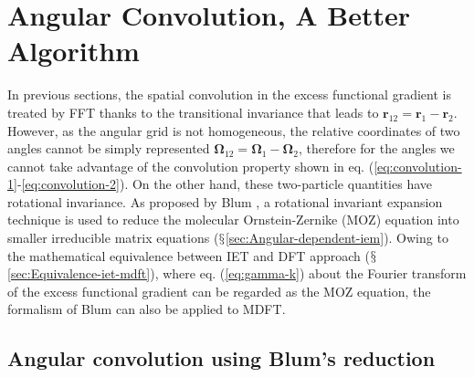 
\chapter{Angular Convolution, A Better Algorithm\label{chpt:angular-convolution}}

In previous sections, the spatial convolution in the excess functional
gradient is treated by \acs{FFT} thanks to the transitional invariance
that leads to $\mathbf{r}_{12}=\mathbf{r}_{1}-\mathbf{r}_{2}$. However,
as the angular grid is not homogeneous, the relative coordinates of
two angles cannot be simply represented $\mathbf{\Omega}_{12}=\mathbf{\Omega}_{1}-\mathbf{\Omega}_{2}$,
therefore for the angles we cannot take advantage of the convolution
property shown in eq. (\ref{eq:convolution-1}-\ref{eq:convolution-2}).
On the other hand, these two-particle quantities have rotational invariance.
As proposed by Blum \citep{Blum_I,Blum_II}, a rotational invariant
expansion technique is used to reduce the molecular Ornstein-Zernike
(\acs{MOZ}) equation into smaller irreducible matrix equations ($\mathsection$\ref{sec:Angular-dependent-iem}).
Owing to the mathematical equivalence between \acs{IET} and \acs{DFT}
approach ($\mathsection$\ref{sec:Equivalence-iet-mdft}), where eq.
(\ref{eq:gamma-k}) about the Fourier transform of the excess functional
gradient can be regarded as the \acs{MOZ} equation, the formalism
of Blum can also be applied to \acs{MDFT}.

\section{Angular convolution using Blum's reduction}

